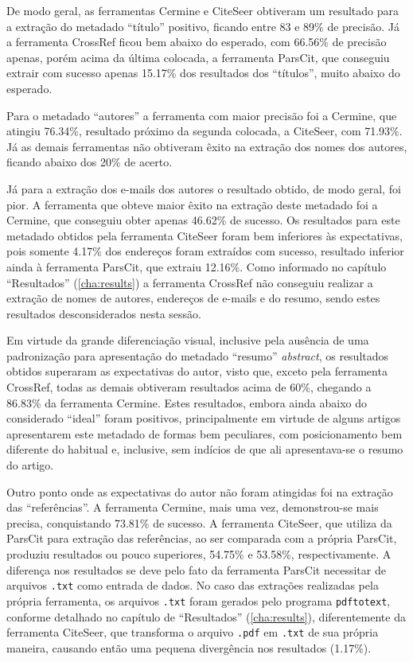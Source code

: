 De modo geral, as ferramentas Cermine e CiteSeer obtiveram um resultado para a extração do metadado ``título'' positivo, ficando entre 83 e 89\% de precisão. Já a ferramenta CrossRef ficou bem abaixo do esperado, com 66.56\% de precisão apenas, porém acima da última colocada, a ferramenta ParsCit, que conseguiu extrair com sucesso apenas 15.17\% dos resultados dos ``títulos'', muito abaixo do esperado.

Para o metadado ``autores'' a ferramenta com maior precisão foi a Cermine, que atingiu 76.34\%, resultado próximo da segunda colocada, a CiteSeer, com 71.93\%. Já as demais ferramentas não obtiveram êxito na extração dos nomes dos autores, ficando abaixo dos 20\% de acerto.

Já para a extração dos e-mails dos autores o resultado obtido, de modo geral, foi pior. A ferramenta que obteve maior êxito na extração deste metadado foi a Cermine, que conseguiu obter apenas 46.62\% de sucesso. Os resultados para este metadado obtidos pela ferramenta CiteSeer foram bem inferiores às expectativas, pois somente 4.17\% dos endereços foram extraídos com sucesso, resultado inferior ainda à ferramenta ParsCit, que extraiu 12.16\%. Como informado no capítulo ``Resultados'' (\autoref{cha:results}) a ferramenta CrossRef não conseguiu realizar a extração de nomes de autores, endereços de e-mails e do resumo, sendo estes resultados desconsiderados nesta sessão.

Em virtude da grande diferenciação visual, inclusive pela ausência de uma padronização para apresentação do metadado ``resumo'' \emph{abstract}, os resultados obtidos superaram as expectativas do autor, visto que, exceto pela ferramenta CrossRef, todas as demais obtiveram resultados acima de 60\%, chegando a 86.83\% da ferramenta Cermine. Estes resultados, embora ainda abaixo do considerado ``ideal'' foram positivos, principalmente em virtude de alguns artigos apresentarem este metadado de formas bem peculiares, com posicionamento bem diferente do habitual e, inclusive, sem indícios de que ali apresentava-se o resumo do artigo.

Outro ponto onde as expectativas do autor não foram atingidas foi na extração das ``referências''. A ferramenta Cermine, mais uma vez, demonstrou-se mais precisa, conquistando 73.81\% de sucesso. A ferramenta CiteSeer, que utiliza da ParsCit para extração das referências, ao ser comparada com a própria ParsCit, produziu resultados ou pouco superiores, 54.75\% e 53.58\%, respectivamente. A diferença nos resultados se deve pelo fato da ferramenta ParsCit necessitar de arquivos \texttt{.txt} como entrada de dados. No caso das extrações realizadas pela própria ferramenta, os arquivos \texttt{.txt} foram gerados pelo programa \texttt{pdftotext}, conforme detalhado no capítulo de ``Resultados'' (\autoref{cha:results}), diferentemente da ferramenta CiteSeer, que transforma o arquivo \texttt{.pdf} em \texttt{.txt} de sua própria maneira, causando então uma pequena divergência nos resultados (1.17\%). 

